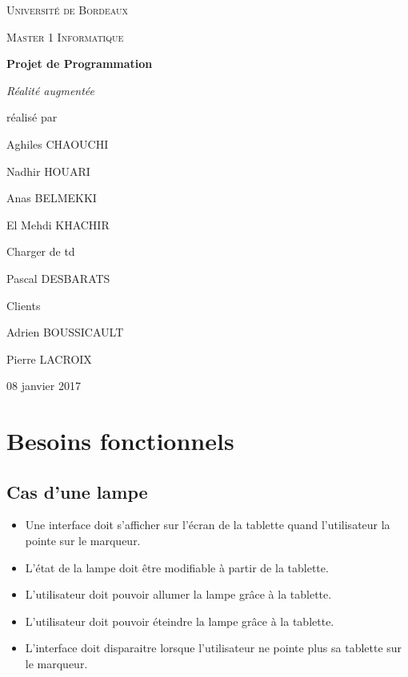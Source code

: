 \documentclass[12pt,a4paper]{article}
\begin{document}
\begin{titlepage}
\centering
{\scshape\LARGE Université de Bordeaux \par}
{\scshape\Large Master 1 Informatique \par}
\vspace{3cm}

{\Huge\bfseries Projet de Programmation \par}%
\vspace{0.5cm}
{\Large\itshape Réalité augmentée \par}

\vfill
réalisé par \par
Aghiles \textsc{CHAOUCHI} \par
Nadhir \textsc{HOUARI} \par
Anas \textsc{BELMEKKI} \par
El Mehdi \textsc{KHACHIR} \par \par
Charger de td \par
Pascal \textsc{DESBARATS} \par \par
Clients \par
Adrien \textsc{BOUSSICAULT} \par
Pierre \textsc{LACROIX} \par
\vfill

{\large 08 janvier 2017\par}

\end{titlepage}

\section{Besoins fonctionnels}
\subsection{Cas d'une lampe}

\begin{itemize}
  \item Une interface doit s'afficher sur l'écran de la tablette quand l'utilisateur la pointe sur le marqueur.
  \item L'état de la lampe doit être modifiable à partir de la tablette.
  \item L'utilisateur doit pouvoir allumer la lampe grâce à la tablette.
  \item L'utilisateur doit pouvoir éteindre la lampe grâce à la tablette.
  \item L'interface doit disparaitre lorsque l'utilisateur ne pointe plus sa tablette sur le marqueur.
\end{itemize}
\end{document}
